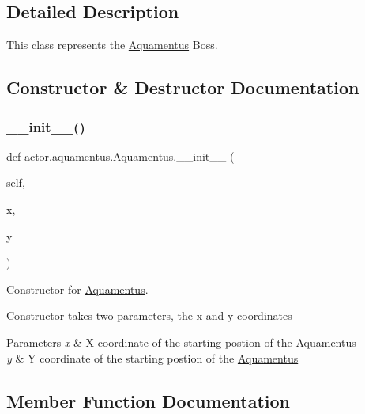 \subsection{Detailed Description}
This class represents the \hyperlink{classactor_1_1aquamentus_1_1_aquamentus}{Aquamentus} Boss. 

\subsection{Constructor \& Destructor Documentation}
\mbox{\label{classactor_1_1aquamentus_1_1_aquamentus_a410081eed92439a0429ea0fb75eb2328}} 
\subsubsection{\texorpdfstring{\+\_\+\+\_\+init\+\_\+\+\_\+()}{\_\_init\_\_()}}
{\footnotesize\ttfamily def actor.\+aquamentus.\+Aquamentus.\+\_\+\+\_\+init\+\_\+\+\_\+ (\begin{DoxyParamCaption}\item[{}]{self,  }\item[{}]{x,  }\item[{}]{y }\end{DoxyParamCaption})}



Constructor for \hyperlink{classactor_1_1aquamentus_1_1_aquamentus}{Aquamentus}. 

Constructor takes two parameters, the x and y coordinates 
\begin{DoxyParams}{Parameters}
{\em x} & X coordinate of the starting postion of the \hyperlink{classactor_1_1aquamentus_1_1_aquamentus}{Aquamentus} \\
\hline
{\em y} & Y coordinate of the starting postion of the \hyperlink{classactor_1_1aquamentus_1_1_aquamentus}{Aquamentus} \\
\hline
\end{DoxyParams}


\subsection{Member Function Documentation}
\mbox{\label{classactor_1_1aquamentus_1_1_aquamentus_a8cd94900aed592550a65f7761a6331bb}} 
